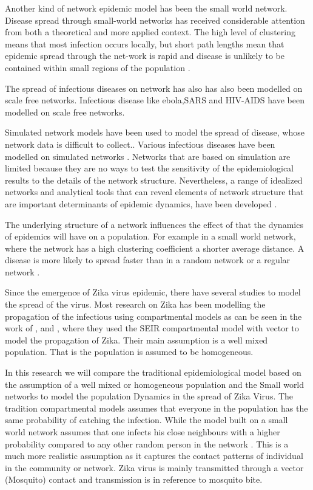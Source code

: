 Another kind of network epidemic model has been the small world network. Disease spread through small-world networks has received considerable attention from both a theoretical and more applied context. The high level of clustering means that most infection occurs locally, but short path lengths mean that epidemic spread through the net-work is rapid and disease is unlikely to be contained within small regions of the population \citep{watts1998collective}.

The spread of infectious diseases on network has also has also been modelled on scale free networks. Infectious disease like ebola,SARS and HIV-AIDS have been modelled on scale free networks. \citep{morita2016six}


Simulated network models have been used to model the spread of disease, whose network data is difficult to collect.. Various infectious diseases have been modelled on simulated networks \citep{keeling2005networks}. Networks that are based on simulation are limited because they are no ways to test the sensitivity of the epidemiological results to the details of the network structure. Nevertheless, a range of idealized networks and analytical tools that can reveal elements of network structure that are important determinants of epidemic dynamics, have been developed \citep{keeling2005networks}. 


 The underlying structure of a network influences  the effect of that the dynamics of epidemics will have on a population. For example in a small world network, where the network has a high clustering coefficient a shorter average distance. A disease is more likely to spread faster than in a random network or a regular network \citep{watts1998collective}.


Since the emergence of Zika virus epidemic, there have several studies to model the spread of the virus. Most research on Zika has been modelling the propagation of the infectious using compartmental models as can be seen in the work of \cite{1}, \cite{2} and \cite{3}, where they used the SEIR compartmental model with vector to model the propagation of Zika. Their main assumption is a well mixed population. That is the population is assumed to be homogeneous.
 
In this research we will compare the traditional epidemiological model based on the  assumption of a well mixed or homogeneous population and the Small world networks to model the population Dynamics in the spread of Zika Virus. The tradition compartmental models assumes that everyone in the population has the same probability of catching the infection. While  the model built on a small world network assumes that  one infects his close neighbours with a higher probability compared to any other random person in the network \citep{newman2002random}. This is a much more realistic assumption as it captures the contact patterns of individual in the community or network. Zika virus is mainly transmitted through a vector (Mosquito) contact and transmission is in reference to mosquito bite.



